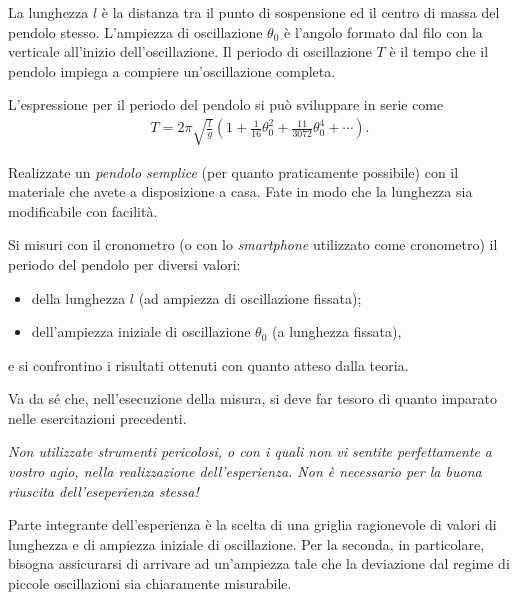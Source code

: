 \documentclass{lab1-article}
\begin{document}
\begin{article}
La lunghezza $l$ \`e la distanza tra il punto di sospensione ed
il centro di massa del pendolo stesso.
L'ampiezza di oscillazione $\theta_0$ \`e l'angolo formato dal filo con la
verticale all'inizio dell'oscillazione.
Il periodo di oscillazione $T$ \`e il tempo che il pendolo impiega a
compiere un'oscillazione completa.

L'espressione per il periodo del pendolo si pu\`o sviluppare in serie come
\begin{align}\label{eq:periodo_pendolo}
  T = 2\pi\sqrt{\frac{l}{g}} \left( 1 + \frac{1}{16}\theta_0^2 +
  \frac{11}{3072}\theta_0^4 + \cdots \right).
\end{align}


\secmeasurements

Realizzate un \emph{pendolo semplice} (per quanto praticamente possibile) con il
materiale che avete a disposizione a casa. Fate in modo che la lunghezza sia
modificabile con facilit\`a.


Si misuri con il cronometro (o con lo \emph{smartphone} utilizzato come cronometro)
il periodo del pendolo per diversi valori:
\begin{itemize}
    \item della lunghezza $l$ (ad ampiezza di oscillazione fissata);
    \item dell'ampiezza iniziale di oscillazione $\theta_0$ (a lunghezza fissata),
\end{itemize}
e si confrontino i risultati ottenuti con quanto atteso dalla teoria.

Va da s\'e che, nell'esecuzione della misura, si deve far tesoro di
quanto imparato nelle esercitazioni precedenti.


\secconsiderations

\emph{Non utilizzate strumenti pericolosi, o con i quali non vi sentite
  perfettamente a vostro agio, nella realizzazione dell'esperienza. Non \`e
  necessario per la buona riuscita dell'eseperienza stessa!}

Parte integrante dell'esperienza \`e la scelta di una griglia ragionevole di
valori di lunghezza e di ampiezza iniziale di oscillazione. Per la seconda, in
particolare, bisogna assicurarsi di arrivare ad un'ampiezza tale che la
deviazione dal regime di piccole oscillazioni sia chiaramente misurabile.


\end{article}
\end{document}
